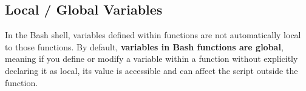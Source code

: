 \documentclass{report}
\begin{document}
    \subsection{Local / Global Variables}
    \bigbreak \noindent 
    \begin{concept}
        In the Bash shell, variables defined within functions are not automatically local to those functions. By default, \textbf{variables in Bash functions are global}, meaning if you define or modify a variable within a function without explicitly declaring it as local, its value is accessible and can affect the script outside the function. 
    \end{concept}
    









    
\end{document}
